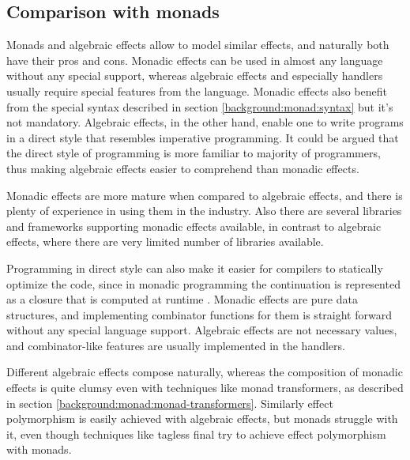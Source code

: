 




\subsection{Comparison with monads}
Monads and algebraic effects allow to model similar effects, and naturally both have their pros and cons. Monadic effects can be used in almost any language without any special support, whereas algebraic effects and especially handlers usually require special features from the language. Monadic effects also benefit from the special syntax described in section \ref{background:monad:syntax} but it's not mandatory. Algebraic effects, in the other hand, enable one to write programs in a direct style that resembles imperative programming. It could be argued that the direct style of programming is more familiar to majority of programmers, thus making algebraic effects easier to comprehend than monadic effects.

Monadic effects are more mature when compared to algebraic effects, and there is plenty of experience in using them in the industry. Also there are several libraries and frameworks supporting monadic effects available, in contrast to algebraic effects, where there are very limited number of libraries available.

Programming in direct style can also make it easier for compilers to statically optimize the code, since in monadic programming the continuation is represented as a closure that is computed at runtime . Monadic effects are pure data structures, and implementing combinator functions for them is straight forward without any special language support. Algebraic effects are not necessary values, and combinator-like features are usually implemented in the handlers.

Different algebraic effects compose naturally, whereas the composition of monadic effects is quite clumsy even with techniques like monad transformers, as described in section \ref{background:monad:monad-transformers}. Similarly effect polymorphism is easily achieved with algebraic effects, but monads struggle with it, even though techniques like tagless final try to achieve effect polymorphism with monads.
